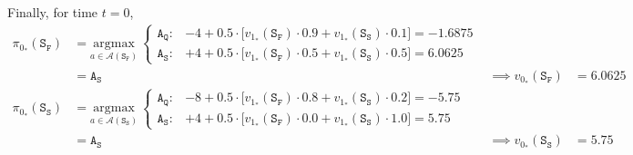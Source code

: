 \documentclass[11pt]{article}
\begin{document}
    Finally, for time $t = 0$,
    \begin{align*}
        \pi_{0_{*}}(\texttt{S}_{\texttt{F}}) &= \underset{a \in \mathcal{A}(\texttt{S}_{\texttt{F}})}{\mathrm{argmax}} \
        \begin{cases}
            \texttt{A}_{\texttt{Q}}: & -4 + 0.5 \cdot \big[ v_{1_{*}}(\texttt{S}_{\texttt{F}}) \cdot 0.9 + v_{1_{*}}(\texttt{S}_{\texttt{S}}) \cdot 0.1 \big] = -1.6875 \\
            \texttt{A}_{\texttt{S}}: & +4 + 0.5 \cdot \big[ v_{1_{*}}(\texttt{S}_{\texttt{F}}) \cdot 0.5 + v_{1_{*}}(\texttt{S}_{\texttt{S}}) \cdot 0.5 \big] = 6.0625
        \end{cases} \\
        &= \texttt{A}_{\texttt{S}} & \implies v_{0_{*}}(\texttt{S}_{\texttt{F}}) &= 6.0625 \\
        \pi_{0_{*}}(\texttt{S}_{\texttt{S}}) &= \underset{a \in \mathcal{A}(\texttt{S}_{\texttt{S}})}{\mathrm{argmax}} \
        \begin{cases}
            \texttt{A}_{\texttt{Q}}: & -8 + 0.5 \cdot \big[ v_{1_{*}}(\texttt{S}_{\texttt{F}}) \cdot 0.8 + v_{1_{*}}(\texttt{S}_{\texttt{S}}) \cdot 0.2 \big] = -5.75 \\
            \texttt{A}_{\texttt{S}}: & +4 + 0.5 \cdot \big[ v_{1_{*}}(\texttt{S}_{\texttt{F}}) \cdot 0.0 + v_{1_{*}}(\texttt{S}_{\texttt{S}}) \cdot 1.0 \big] = 5.75
        \end{cases} \\
        &= \texttt{A}_{\texttt{S}} & \implies v_{0_{*}}(\texttt{S}_{\texttt{S}}) &= 5.75
    \end{align*}
\end{document}

